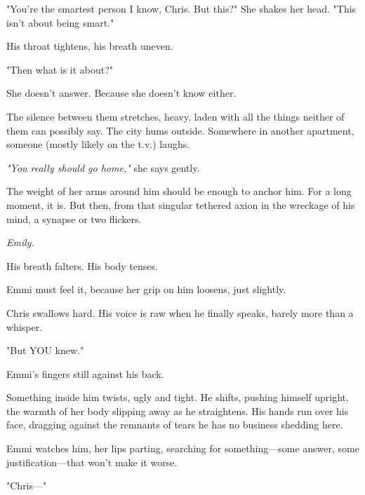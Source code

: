 \smallskip

"You’re the smartest person I know, Chris. But this?" She shakes her head. "This isn’t about being smart."  

His throat tightens, his breath uneven.  

"Then what is it about?" 

She doesn’t answer. Because she doesn’t know either.  

The silence between them stretches, heavy, laden with all the things neither of them can possibly say.  The city hums outside. Somewhere in another apartment, someone (mostly likely on the t.v.) laughs.   

\smallskip

\textit{"You really should go home,"} she says gently.  

\smallskip

The weight of her arms around him should be enough to anchor him.  
For a long moment, it is.  But then, from that singular tethered axion in the wreckage of his mind, a synapse or two flickers. \smallskip

\textit{Emily.}  

\smallskip

His breath falters. His body tenses.  

\smallskip

Emmi must feel it, because her grip on him loosens, just slightly.  

\smallskip

Chris swallows hard. His voice is raw when he finally speaks, barely more than a whisper.  

\smallskip

"But YOU knew."

\smallskip

Emmi’s fingers still against his back.  

\smallskip

Something inside him twists, ugly and tight. He shifts, pushing himself upright, the warmth of her body slipping away as he straightens. His hands run over his face, dragging against the remnants of tears he has no business shedding here.  

\smallskip

Emmi watches him, her lips parting, searching for something—some answer, some justification—that won’t make it worse.  

\smallskip

"Chris—"

\smallskip

